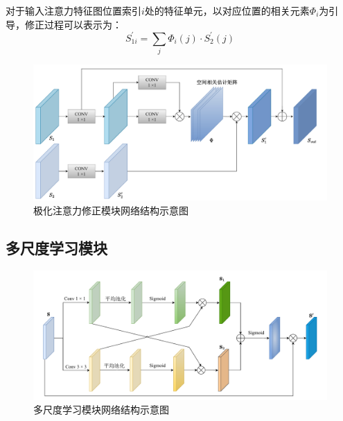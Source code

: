 对于输入注意力特征图位置索引$i$处的特征单元，以对应位置的相关元素$\Phi_i$为引导，修正过程可以表示为：
\begin{equation}
    S_{1i}^{\prime}=\sum_j{\Phi _i\left( j \right) \cdot S_{2}^{\prime}\left( j \right)}
\end{equation}

\begin{figure}[h]
    \centering
    \includegraphics[width=14cm]{pic/chapter3/极化注意力修正.pdf}
    \caption{极化注意力修正模块网络结构示意图}
    \label{DPEN_WFM}
\end{figure}




\subsection{多尺度学习模块}
\label{sec:多尺度学习模块}
\begin{figure}[ht!]
    \centering
    \includegraphics[width=14cm]{pic/chapter3/跨空间学习.pdf}
    \caption{多尺度学习模块网络结构示意图}
    \label{DPEN_CSL}
\end{figure}


